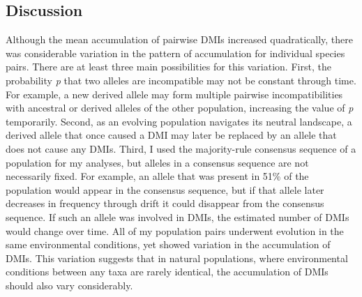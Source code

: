 \begin{doublespace}
\section{Discussion}



Although the mean accumulation of pairwise DMIs increased quadratically,
there was considerable variation in the pattern of accumulation
for individual species pairs.
%
There are at least three main possibilities for this variation.
%
First, the probability \emph{p} that two alleles are incompatible
may not be constant through time.
%
For example, a new derived allele may form multiple pairwise incompatibilities
with ancestral or derived alleles of the other population,
increasing the value of \emph{p} temporarily.
%
Second, as an evolving population navigates its neutral landscape,
a derived allele that once caused a DMI may later be replaced
by an allele that does not cause any DMIs.
%
Third, I used the majority-rule consensus sequence
of a population for my analyses,
but alleles in a consensus sequence are not necessarily fixed.
%
For example, an allele that was present in 51\% of the population
would appear in the consensus sequence,
but if that allele later decreases in frequency through drift
it could disappear from the consensus sequence.
%
If such an allele was involved in DMIs,
the estimated number of DMIs would change over time.
%
All of my population pairs underwent evolution
in the same environmental conditions,
yet showed variation in the accumulation of DMIs.
%
This variation suggests that in natural populations,
where environmental conditions between any taxa are rarely identical,
the accumulation of DMIs should also vary considerably.



\end{doublespace}
